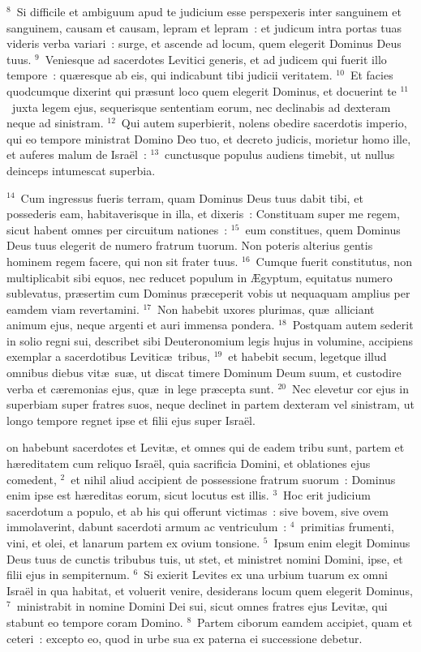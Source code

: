 ${}^{8}$~Si difficile et ambiguum apud te judicium esse perspexeris inter sanguinem et sanguinem, causam et causam, lepram et lepram~: et judicum intra portas tuas videris verba variari~: surge, et ascende ad locum, quem elegerit Dominus Deus tuus.
${}^{9}$~Veniesque ad sacerdotes Levitici generis, et ad judicem qui fuerit illo tempore~: qu\ae resque ab eis, qui indicabunt tibi judicii veritatem.
${}^{10}$~Et facies quodcumque dixerint qui pr\ae sunt loco quem elegerit Dominus, et docuerint te
${}^{11}$~juxta legem ejus, sequerisque sententiam eorum, nec declinabis ad dexteram neque ad sinistram.
${}^{12}$~Qui autem superbierit, nolens obedire sacerdotis imperio, qui eo tempore ministrat Domino Deo tuo, et decreto judicis, morietur homo ille, et auferes malum de Isra\"el~:
${}^{13}$~cunctusque populus audiens timebit, ut nullus deinceps intumescat superbia.


${}^{14}$~Cum ingressus fueris terram, quam Dominus Deus tuus dabit tibi, et possederis eam, habitaverisque in illa, et dixeris~: Constituam super me regem, sicut habent omnes per circuitum nationes~:
${}^{15}$~eum constitues, quem Dominus Deus tuus elegerit de numero fratrum tuorum. Non poteris alterius gentis hominem regem facere, qui non sit frater tuus.
${}^{16}$~Cumque fuerit constitutus, non multiplicabit sibi equos, nec reducet populum in \AE gyptum, equitatus numero sublevatus, pr\ae sertim cum Dominus pr\ae ceperit vobis ut nequaquam amplius per eamdem viam revertamini.
${}^{17}$~Non habebit uxores plurimas, qu\ae\ alliciant animum ejus, neque argenti et auri immensa pondera.
${}^{18}$~Postquam autem sederit in solio regni sui, describet sibi Deuteronomium legis hujus in volumine, accipiens exemplar a sacerdotibus Levitic\ae\ tribus,
${}^{19}$~et habebit secum, legetque illud omnibus diebus vit\ae\ su\ae , ut discat timere Dominum Deum suum, et custodire verba et c\ae remonias ejus, qu\ae\ in lege pr\ae cepta sunt.
${}^{20}$~Nec elevetur cor ejus in superbiam super fratres suos, neque declinet in partem dexteram vel sinistram, ut longo tempore regnet ipse et filii ejus super Isra\"el.

\bchapter
{}on habebunt sacerdotes et Levit\ae , et omnes qui de eadem tribu sunt, partem et h\ae reditatem cum reliquo Isra\"el, quia sacrificia Domini, et oblationes ejus comedent,
${}^{2}$~et nihil aliud accipient de possessione fratrum suorum~: Dominus enim ipse est h\ae reditas eorum, sicut locutus est illis.
${}^{3}$~Hoc erit judicium sacerdotum a populo, et ab his qui offerunt victimas~: sive bovem, sive ovem immolaverint, dabunt sacerdoti armum ac ventriculum~:
${}^{4}$~primitias frumenti, vini, et olei, et lanarum partem ex ovium tonsione.
${}^{5}$~Ipsum enim elegit Dominus Deus tuus de cunctis tribubus tuis, ut stet, et ministret nomini Domini, ipse, et filii ejus in sempiternum.
${}^{6}$~Si exierit Levites ex una urbium tuarum ex omni Isra\"el in qua habitat, et voluerit venire, desiderans locum quem elegerit Dominus,
${}^{7}$~ministrabit in nomine Domini Dei sui, sicut omnes fratres ejus Levit\ae , qui stabunt eo tempore coram Domino.
${}^{8}$~Partem ciborum eamdem accipiet, quam et ceteri~: excepto eo, quod in urbe sua ex paterna ei successione debetur.


